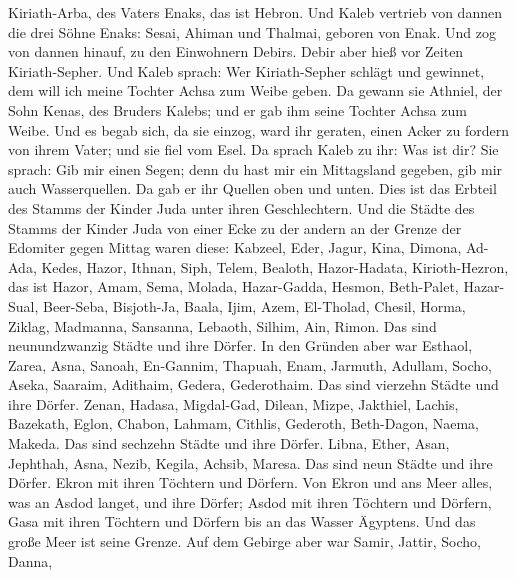 Kiriath-Arba, des Vaters Enaks, das ist Hebron.  Und Kaleb
vertrieb von dannen die drei Söhne Enaks: Sesai, Ahiman und Thalmai,
geboren von Enak.  Und zog von dannen hinauf, zu den
Einwohnern Debirs. Debir aber hieß vor Zeiten Kiriath-Sepher.
 Und Kaleb sprach: Wer Kiriath-Sepher schlägt und gewinnet,
dem will ich meine Tochter Achsa zum Weibe geben.  Da
gewann sie Athniel, der Sohn Kenas, des Bruders Kalebs; und er gab ihm
seine Tochter Achsa zum Weibe.  Und es begab sich, da sie
einzog, ward ihr geraten, einen Acker zu fordern von ihrem Vater; und
sie fiel vom Esel. Da sprach Kaleb zu ihr: Was ist dir? 
Sie sprach: Gib mir einen Segen; denn du hast mir ein Mittagsland
gegeben, gib mir auch Wasserquellen. Da gab er ihr Quellen oben und
unten.  Dies ist das Erbteil des Stamms der Kinder Juda
unter ihren Geschlechtern.  Und die Städte des Stamms der
Kinder Juda von einer Ecke zu der andern an der Grenze der Edomiter
gegen Mittag waren diese: Kabzeel, Eder, Jagur,  Kina,
Dimona, Ad-Ada,  Kedes, Hazor, Ithnan,  Siph,
Telem, Bealoth,  Hazor-Hadata, Kirioth-Hezron, das ist
Hazor,  Amam, Sema, Molada,  Hazar-Gadda,
Hesmon, Beth-Palet,  Hazar-Sual, Beer-Seba, Bisjoth-Ja,
 Baala, Ijim, Azem,  El-Tholad, Chesil, Horma,
 Ziklag, Madmanna, Sansanna,  Lebaoth, Silhim,
Ain, Rimon. Das sind neunundzwanzig Städte und ihre Dörfer.
 In den Gründen aber war Esthaol, Zarea, Asna,
 Sanoah, En-Gannim, Thapuah, Enam,  Jarmuth,
Adullam, Socho, Aseka,  Saaraim, Adithaim, Gedera,
Gederothaim. Das sind vierzehn Städte und ihre Dörfer. 
Zenan, Hadasa, Migdal-Gad,  Dilean, Mizpe, Jakthiel,
 Lachis, Bazekath, Eglon,  Chabon, Lahmam,
Cithlis,  Gederoth, Beth-Dagon, Naema, Makeda. Das sind
sechzehn Städte und ihre Dörfer.  Libna, Ether, Asan,
 Jephthah, Asna, Nezib,  Kegila, Achsib,
Maresa. Das sind neun Städte und ihre Dörfer.  Ekron mit
ihren Töchtern und Dörfern.  Von Ekron und ans Meer alles,
was an Asdod langet, und ihre Dörfer;  Asdod mit ihren
Töchtern und Dörfern, Gasa mit ihren Töchtern und Dörfern bis an das
Wasser Ägyptens. Und das große Meer ist seine Grenze.  Auf
dem Gebirge aber war Samir, Jattir, Socho,  Danna,

